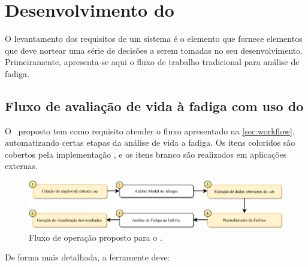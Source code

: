 \chapter{Desenvolvimento do \frame}\label{chap:software}

O levantamento dos requisitos de um sistema é o elemento que fornece elementos que deve nortear uma série de decisões a serem tomadas no seu desenvolvimento. Primeiramente, apresenta-se aqui o fluxo de trabalho tradicional para análise de fadiga.




\section{Fluxo de avaliação de vida à fadiga com uso do \frame}


O \frame\ proposto tem como requisito atender o fluxo apresentado na \autoref{sec:workflow}, automatizando certas etapas da análise de vida a fadiga. Os itens coloridos são cobertos pela implementação \frame, e os itens  branco são realizados em aplicações externas.


\begin{figure}[!ht]
    \centering
    \caption{Fluxo de operação proposto para o \frame.}\label{fig:workflow}
    \includegraphics[width=\textwidth]{imagens/fluxograma_automatizado}
\end{figure}

De forma mais detalhada, a ferramente deve:

